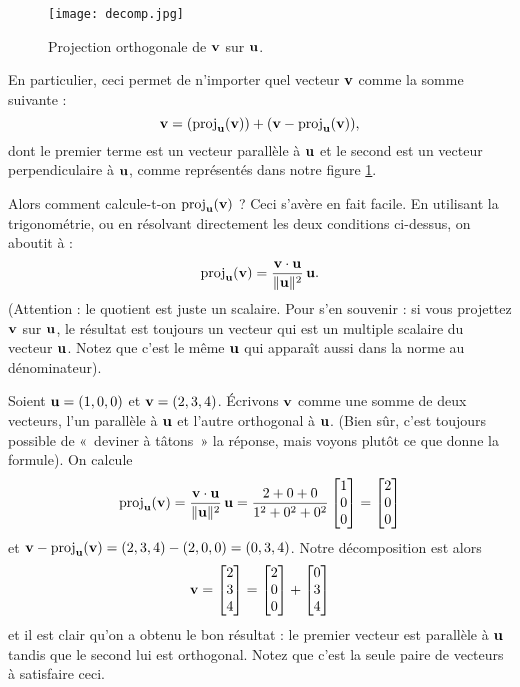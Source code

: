 \begin{figure}
\begin{center}
\texttt{[image: decomp.jpg]}~\\[1cm]
\end{center}
\caption{Projection orthogonale de $\mathbf{v}$ sur $\mathbf{u}$.}\label{orthoprojonvector}
\end{figure}
En particulier, ceci permet de  n'importer quel vecteur  $\mathbf{v}$ comme la somme suivante :
$$
\mathbf{v} = (\operatorname{proj}_{\mathbf{u}}(\mathbf{v}))+ (\mathbf{v}-\operatorname{proj}_{\mathbf{u}}(\mathbf{v})),
$$
dont le premier terme est un vecteur parallèle à $\mathbf{u}$ et le second est un vecteur perpendiculaire à $\mathbf{u}$,
comme représentés dans notre figure \ref{orthoprojonvector}.

Alors comment calcule-t-on $\operatorname{proj}_{\mathbf{u}}(\mathbf{v})$ ?  Ceci s'avère en fait facile.
En utilisant la trigonométrie, ou en résolvant directement les deux conditions ci-dessus, on aboutit à :
$$
\operatorname{proj}_{\mathbf{u}}(\mathbf{v}) = \frac{\mathbf{v} \cdot \mathbf{u}}{\Vert \mathbf{u} \Vert^2} \,\mathbf{u}.
$$\label{projR3}
(Attention : le quotient est juste un scalaire.  Pour s'en souvenir :
si vous projettez $\mathbf{v}$ sur $\mathbf{u}$, le résultat est toujours un vecteur qui est un multiple scalaire du vecteur $\mathbf{u}$. Notez que c'est le même $\mathbf{u}$ qui apparaît aussi dans la norme au dénominateur).

\begin{myexample}
Soient $\mathbf{u} = (1,0,0)$ et $\mathbf{v} = (2,3,4)$.  Écrivons $\mathbf{v}$ comme une somme
de deux vecteurs, l'un parallèle à $\mathbf{u}$ et l'autre orthogonal à $\mathbf{u}$.
(Bien sûr, c'est toujours possible de «~deviner à tâtons~» la réponse, mais voyons plutôt ce que donne la formule).
On calcule
$$
\operatorname{proj}_{\mathbf{u}}(\mathbf{v}) = \frac{\mathbf{v} \cdot \mathbf{u}}{\Vert \mathbf{u} \Vert^2} \,\mathbf{u}
= \frac{2+0+0}{1^2+0^2+0^2}\left[ \begin{matrix} 1\\0\\0 \end{matrix} \right] = \left[ \begin{matrix} 2\\0\\0 \end{matrix} \right]
$$
et $\mathbf{v} - \operatorname{proj}_{\mathbf{u}}(\mathbf{v}) = (2,3,4)-(2,0,0) = (0,3,4)$. Notre
décomposition est alors
$$
\mathbf{v} = \left[ \begin{matrix} 2\\3\\4 \end{matrix} \right] = \left[ \begin{matrix} 2\\0\\0 \end{matrix} \right]+\left[ \begin{matrix} 0\\3\\4 \end{matrix} \right]
$$
et il est clair qu'on a obtenu le bon résultat : le premier vecteur est parallèle à $\mathbf{u}$ tandis que 
le second lui est orthogonal. Notez que c'est la seule
paire de vecteurs à satisfaire ceci.
\end{myexample}

